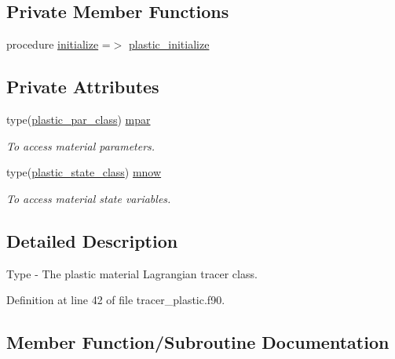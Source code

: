 \subsection*{Private Member Functions}
\begin{DoxyCompactItemize}
\item 
procedure \mbox{\hyperlink{structtracer__plastic__mod_1_1plastic__class_af0274af24d9d0dab89751456a0ef83bb}{initialize}} =$>$ \mbox{\hyperlink{namespacetracer__plastic__mod_a42882cd86cfe30f341d8150582a664a9}{plastic\+\_\+initialize}}
\end{DoxyCompactItemize}
\subsection*{Private Attributes}
\begin{DoxyCompactItemize}
\item 
type(\mbox{\hyperlink{structtracer__plastic__mod_1_1plastic__par__class}{plastic\+\_\+par\+\_\+class}}) \mbox{\hyperlink{structtracer__plastic__mod_1_1plastic__class_ae1a94a8bd2796aa13dfa820845f56563}{mpar}}
\begin{DoxyCompactList}\small\item\em To access material parameters. \end{DoxyCompactList}\item 
type(\mbox{\hyperlink{structtracer__plastic__mod_1_1plastic__state__class}{plastic\+\_\+state\+\_\+class}}) \mbox{\hyperlink{structtracer__plastic__mod_1_1plastic__class_ae30b971a131c8203026a7631dff3a51f}{mnow}}
\begin{DoxyCompactList}\small\item\em To access material state variables. \end{DoxyCompactList}\end{DoxyCompactItemize}


\subsection{Detailed Description}
Type -\/ The plastic material Lagrangian tracer class. 

Definition at line 42 of file tracer\+\_\+plastic.\+f90.



\subsection{Member Function/\+Subroutine Documentation}
\mbox{\label{structtracer__plastic__mod_1_1plastic__class_af0274af24d9d0dab89751456a0ef83bb}} 
